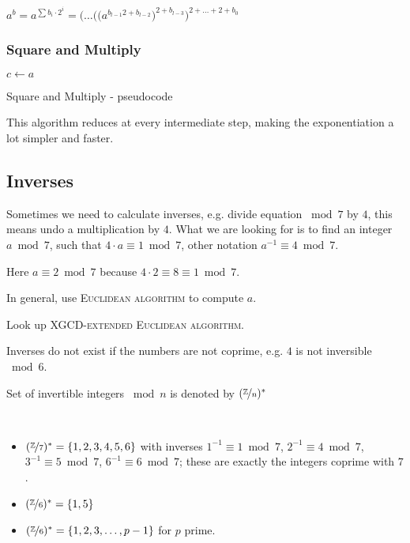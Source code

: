 $a^b = a^{\sum b_i \cdot 2^i} = \Big( \dots \big( \big( a^{b_{l-1}2 + b_{l-2}}\big)^{2+b_{l-3}} \Big)^{2+\dots+2+b_0}$

\subsubsection{Square and Multiply}

\begin{algorithm}[H]
$c \leftarrow a$ \;
 \caption{Square and Multiply - pseudocode}
\end{algorithm}

\begin{remark}
This algorithm reduces at every intermediate step, making the exponentiation a lot simpler and faster.
\end{remark}

\subsection{Inverses}

Sometimes we need to calculate inverses, e.g. divide equation $\bmod 7$ by $4$, this means undo a multiplication by $4$. What we are looking for is to find an integer $a \bmod 7$, such that $4 \cdot a \equiv 1 \bmod 7$, other notation $a^{-1} \equiv 4 \bmod 7$.

Here $a \equiv 2 \bmod 7$ because $4 \cdot 2 \equiv 8 \equiv 1 \bmod 7$.

In general, use \textsc{Euclidean algorithm} to compute $a$.

\begin{remark}
Look up \textsc{XGCD-extended Euclidean algorithm}. %
\end{remark}

Inverses do not exist if the numbers are not coprime, e.g. $4$ is not inversible $\bmod 6$.

\begin{notation}
Set of invertible integers $\bmod n$ is denoted by $(\nicefrac{\mathbb{Z}}{n})^{\ast}$
\end{notation}

\begin{example} \ \\
\begin{itemize}
\item $(\nicefrac{\mathbb{Z}}{7})^{\ast} =\{1,2,3,4,5,6\}$ with inverses $1^{-1} \equiv 1 \bmod 7$, $2^{-1} \equiv 4 \bmod 7$, $3^{-1} \equiv 5 \bmod 7$, $6^{-1} \equiv  6 \bmod 7$; these are exactly the integers coprime with $7$.
\item $(\nicefrac{\mathbb{Z}}{6})^{\ast} = \{1,5\}$
\item $(\nicefrac{\mathbb{Z}}{6})^{\ast} = \{1,2,3,\dots,p-1\}$ for $p$ prime.
\end{itemize}
\end{example}


